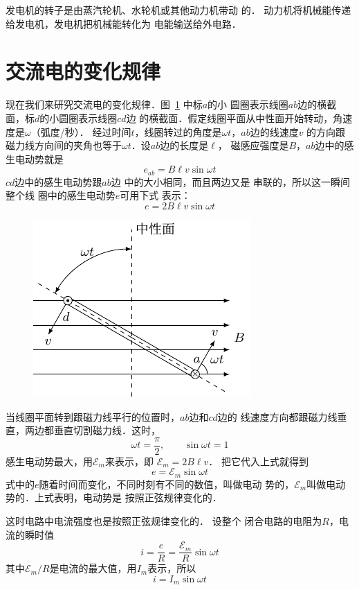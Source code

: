 发电机的转子是由蒸汽轮机、水轮机或其他动力机带动
的．
动力机将机械能传递给发电机，发电机把机械能转化为
电能输送给外电路．

\section{交流电的变化规律}



现在我们来研究交流电的变化规律．图~\ref{fig_C_3-2} 中标$a$的小
圆圈表示线圈$ab$边的横截面，标$d$的小圆圈表示线圈$cd$边
的横截面．假定线圈平面从中性面开始转动，角速度是$\omega$（弧度/秒）．
经过时间$t$，线圈转过的角度是$\omega t$，$ab$边的线速度$v$
的方向跟磁力线方向间的夹角也等于$\omega t$．设$ab$边的长度是$\ell$，
磁感应强度是$B$，$ab$边中的感
生电动势就是
\[e_{ab}=B\ell v\sin \omega t\]
$cd$边中的感生电动势跟$ab$边
中的大小相同，而且两边又是
串联的，所以这一瞬间整个线
圈中的感生电动势$e$可用下式
表示：
\[e=2B\ell v\sin \omega t\]


\begin{figure}[htbp]
	\centering
	\includegraphics{fig/C/3-2.pdf}
	\caption{}\label{fig_C_3-2}
\end{figure}

当线圈平面转到跟磁力线平行的位置时，$ab$边和$cd$边的
线速度方向都跟磁力线垂直，两边都垂直切割磁力线．这时，
\[\omega t=\frac{\pi}{2},\qquad \sin \omega t=1 \]
感生电动势最大，用$\mathcal{E}_m$来表示，即
$\mathcal{E}_m=2B\ell v$．
把它代入上式就得到
\begin{equation}\label{eq_C_3-1}
    e=\mathcal{E}_m \sin\omega t
\end{equation}
式中的$e$随着时间而变化，不同时刻有不同的数值，叫做电动
势的，$\mathcal{E}_m$叫做电动势的．上式表明，电动势是
按照正弦规律变化的．

这时电路中电流强度也是按照正弦规律变化的．
设整个
闭合电路的电阻为$R$，电流的瞬时值
\[i=\frac{e}{R}=\frac{\mathcal{E}_m}{R} \sin\omega t \]
其中$\mathcal{E}_m/R$是电流的最大值，用$I_m$表示，所以
\begin{equation}\label{eq_C_3-2}
    i=I_m \sin\omega t
\end{equation}

